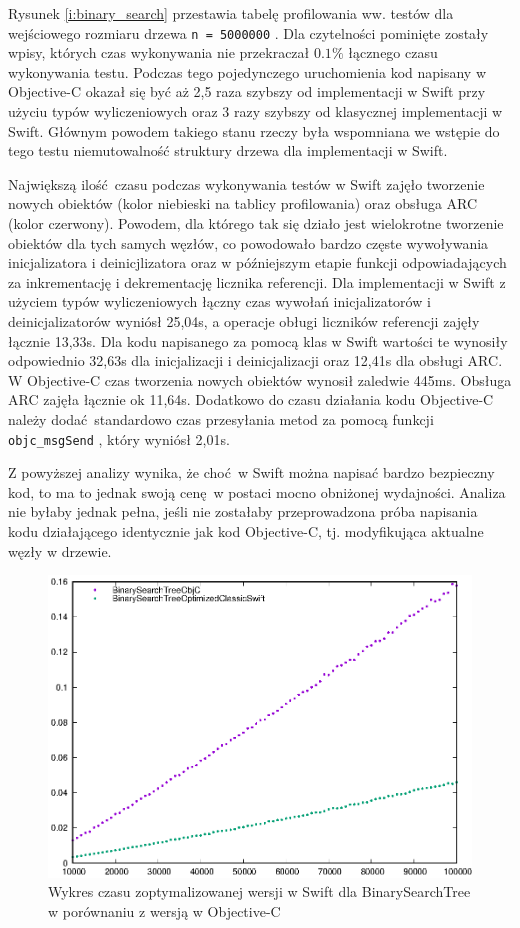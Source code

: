 \documentclass[mgr, shortabstract]{iithesis}
\newcommand{\swiftinline}[1]{
    \texttt{#1}
}
\newcommand{\objcinline}[1]{
    \texttt{#1}
}
\begin{document}
Rysunek \ref{i:binary_search} przestawia tabelę profilowania ww. testów dla wejściowego rozmiaru drzewa \swiftinline{n = 5000000}. Dla czytelności pominięte zostały wpisy, których czas wykonywania nie przekraczał $0.1\%$ łącznego czasu wykonywania testu. Podczas tego pojedynczego uruchomienia kod napisany w Objective-C okazał się być aż 2,5 raza szybszy od implementacji w Swift przy użyciu typów wyliczeniowych oraz 3 razy szybszy od klasycznej implementacji w Swift. Głównym powodem takiego stanu rzeczy była wspomniana we wstępie do tego testu niemutowalność struktury drzewa dla implementacji w Swift. 

Największą ilość czasu podczas wykonywania testów w Swift zajęło tworzenie nowych obiektów (kolor niebieski na tablicy profilowania) oraz obsługa ARC (kolor czerwony). Powodem, dla którego tak się działo jest wielokrotne tworzenie obiektów dla tych samych węzłów, co powodowało bardzo częste wywoływania inicjalizatora i deinicjlizatora oraz w późniejszym etapie funkcji odpowiadających za inkrementację i dekrementację licznika referencji. Dla implementacji w Swift z użyciem typów wyliczeniowych łączny czas wywołań inicjalizatorów i deinicjalizatorów wyniósł 25,04s, a operacje obługi liczników referencji zajęły łącznie 13,33s. Dla kodu napisanego za pomocą klas w Swift wartości te wynosiły odpowiednio 32,63s dla inicjalizacji i deinicjalizacji oraz 12,41s dla obsługi ARC. W Objective-C czas tworzenia nowych obiektów wynosił zaledwie 445ms. Obsługa ARC zajęła łącznie ok 11,64s. Dodatkowo do czasu działania kodu Objective-C należy dodać standardowo czas przesyłania metod za pomocą funkcji \objcinline{objc_msgSend}, który wyniósł 2,01s.

Z powyższej analizy wynika, że choć w Swift można napisać bardzo bezpieczny kod, to ma to jednak swoją cenę w postaci mocno obniżonej wydajności. Analiza nie byłaby jednak pełna, jeśli nie zostałaby przeprowadzona próba napisania kodu działającego identycznie jak kod Objective-C, tj. modyfikująca aktualne węzły w drzewie. 

\begin{figure}
    \includegraphics{plots/BinarySearchTree2.eps}
    \caption{Wykres czasu zoptymalizowanej wersji w Swift dla BinarySearchTree w porównaniu z wersją w Objective-C}
    \label{p:binary_search2}
\end{figure}
\end{document}

